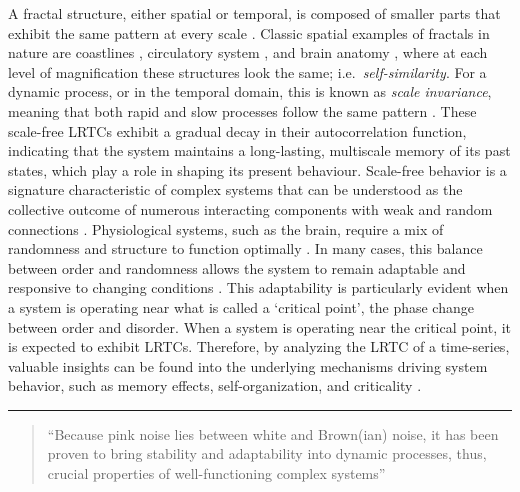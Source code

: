 \documentclass[
  sn-vancouver,
  Numbered,
  referee,
  lineno]{sn-jnl}
\begin{document}
A fractal structure, either spatial or temporal, is composed of smaller
parts that exhibit the same pattern at every scale
\citep{koch1904, kochMethodeGeometriqueElementaire1906, mandelbrotHowLongCoast1967}.
Classic spatial examples of fractals in nature are coastlines
\citep{mandelbrotHowLongCoast1967}, circulatory system
\citep{jayalalithaFractalModelBlood2008}, and brain anatomy
\citep{ansellUnveilingUniversalAspects2024}, where at each level of
magnification these structures look the same;
i.e.~\emph{self-similarity}. For a dynamic process, or in the temporal
domain, this is known as \emph{scale invariance}, meaning that both
rapid and slow processes follow the same pattern
\citep{rileyTutorialIntroductionAdaptive2012}. These scale-free LRTCs
exhibit a gradual decay in their autocorrelation function, indicating
that the system maintains a long-lasting, multiscale memory of its past
states, which play a role in shaping its present behaviour. Scale-free
behavior is a signature characteristic of complex systems that can be
understood as the collective outcome of numerous interacting components
with weak and random connections
\citep{csermelyWeakLinksStabilizers2006}. Physiological systems, such as
the brain, require a mix of randomness and structure to function
optimally \citep{bakSelforganizedCriticalityExplanation1987}. In many
cases, this balance between order and randomness allows the system to
remain adaptable and responsive to changing conditions
\citep{lipsitzLossComplexityAging1992, lipsitzDynamicsStabilityPhysiologic2002}.
This adaptability is particularly evident when a system is operating
near what is called a `critical point', the phase change between order
and disorder. When a system is operating near the critical point, it is
expected to exhibit LRTCs. Therefore, by analyzing the LRTC of a
time-series, valuable insights can be found into the underlying
mechanisms driving system behavior, such as memory effects,
self-organization, and criticality \citep{beggsCortexCriticalPoint2022}.

\begin{center}\rule{0.5\linewidth}{0.5pt}\end{center}

\begin{quote}
``Because pink noise lies between white and Brown(ian) noise, it has
been proven to bring stability and adaptability into dynamic processes,
thus, crucial properties of well-functioning complex systems''
\citep{bakSelforganizedCriticalityExplanation1987}
\end{quote}
\end{document}
